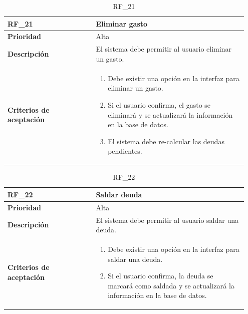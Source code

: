 \begin{table}[htb!]
    \begin{tabular}{|p{0.35\linewidth}|p{0.6\linewidth}|}
        \hline
        \rowcolor[HTML]{C0C0C0}  
        \textbf{RF\_21} & \textbf{Eliminar gasto} \\
        \hline
        \textbf{Prioridad} & Alta \\
        \hline
        \textbf{Descripción} & El sistema debe permitir al usuario eliminar un gasto.  \\
        \hline
        \vspace{0.5mm}
        \textbf{Criterios de aceptación} & 
        \begin{minipage}[t]{0.9\linewidth}
            \begin{enumerate}
                \item Debe existir una opción en la interfaz para eliminar un gasto.
                \item Si el usuario confirma, el gasto se eliminará y se actualizará la información en la base de datos.
                \item El sistema debe re-calcular las deudas pendientes.
            \end{enumerate}
            \vspace{2mm}
        \end{minipage} \\
        \hline
    \end{tabular}
    \caption{RF\_21}
    \label{req:RF21}
\end{table}

\begin{table}[htb!]
    \begin{tabular}{|p{0.35\linewidth}|p{0.6\linewidth}|}
        \hline
        \rowcolor[HTML]{C0C0C0}  
        \textbf{RF\_22} & \textbf{Saldar deuda} \\
        \hline
        \textbf{Prioridad} & Alta \\
        \hline
        \textbf{Descripción} & El sistema debe permitir al usuario saldar una deuda.  \\
        \hline
        \vspace{0.5mm}
        \textbf{Criterios de aceptación} & 
        \begin{minipage}[t]{0.9\linewidth}
            \begin{enumerate}
                \item Debe existir una opción en la interfaz para saldar una deuda.
                \item Si el usuario confirma, la deuda se marcará como saldada y se actualizará la información en la base de datos.
            \end{enumerate}
            \vspace{2mm}
        \end{minipage} \\
        \hline
    \end{tabular}
    \caption{RF\_22}
    \label{req:RF22}
\end{table}

